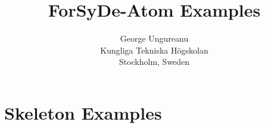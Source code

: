 \documentclass{report}
\title{ForSyDe-Atom Examples}
\author{George Ungureanu \\ Kungliga Tekniska H\"{o}gskolan \\ Stockholm, Sweden}
\begin{document}
\maketitle

\tableofcontents




\chapter{Skeleton Examples}




\end{document}
